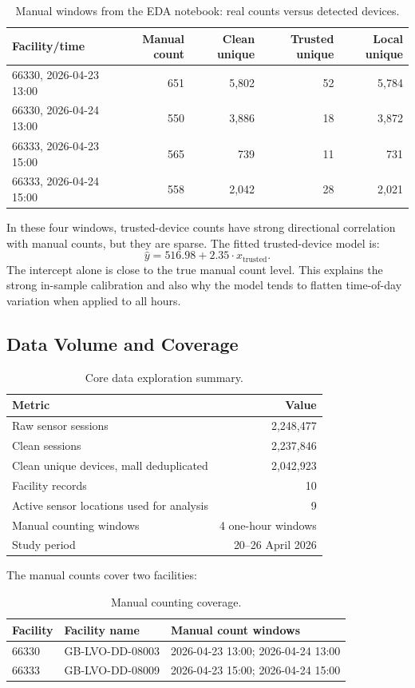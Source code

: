 \documentclass[11pt,a4paper]{article}
\begin{document}
\begin{table}[!htbp]
\centering
\caption{Manual windows from the EDA notebook: real counts versus detected devices.}
\small
\begin{tabular}{lrrrr}
\toprule
Facility/time & Manual count & Clean unique & Trusted unique & Local unique \\
\midrule
66330, 2026-04-23 13:00 & 651 & 5,802 & 52 & 5,784 \\
66330, 2026-04-24 13:00 & 550 & 3,886 & 18 & 3,872 \\
66333, 2026-04-23 15:00 & 565 & 739 & 11 & 731 \\
66333, 2026-04-24 15:00 & 558 & 2,042 & 28 & 2,021 \\
\bottomrule
\end{tabular}
\normalsize
\end{table}

In these four windows, trusted-device counts have strong directional correlation with manual counts, but they are sparse. The fitted trusted-device model is:
\[
  \widehat{y} = 516.98 + 2.35 \cdot x_{\text{trusted}}.
\]
The intercept alone is close to the true manual count level. This explains the strong in-sample calibration and also why the model tends to flatten time-of-day variation when applied to all hours.

\subsection{Data Volume and Coverage}

\begin{table}[!htbp]
\centering
\caption{Core data exploration summary.}
\begin{tabular}{lr}
\toprule
Metric & Value \\
\midrule
Raw sensor sessions & 2,248,477 \\
Clean sessions & 2,237,846 \\
Clean unique devices, mall deduplicated & 2,042,923 \\
Facility records & 10 \\
Active sensor locations used for analysis & 9 \\
Manual counting windows & 4 one-hour windows \\
Study period & 20--26 April 2026 \\
\bottomrule
\end{tabular}
\end{table}

The manual counts cover two facilities:
\begin{table}[!htbp]
\centering
\caption{Manual counting coverage.}
\begin{tabular}{lll}
\toprule
Facility & Facility name & Manual count windows \\
\midrule
66330 & GB-LVO-DD-08003 & 2026-04-23 13:00; 2026-04-24 13:00 \\
66333 & GB-LVO-DD-08009 & 2026-04-23 15:00; 2026-04-24 15:00 \\
\bottomrule
\end{tabular}
\end{table}
\end{document}
